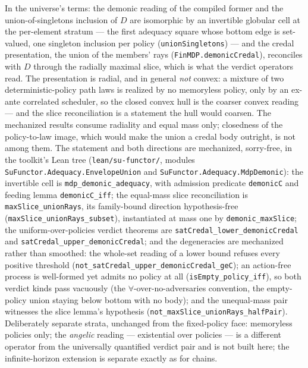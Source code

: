In the universe's terms: the demonic reading of the compiled former
and the union-of-singletons inclusion of $D$ are isomorphic by an
invertible globular cell at the per-element stratum --- the first
adequacy square whose bottom edge is set-valued, one singleton
inclusion per policy (\texttt{unionSingletons}) --- and the credal
presentation, the union of the members' rays
(\texttt{FinMDP.demonicCredal}), reconciles with $D$ through the
radially maximal slice, which is what the verdict operators read.
The presentation is radial, and in general \emph{not} convex: a
mixture of two deterministic-policy path laws is realized by no
memoryless policy, only by an ex-ante correlated scheduler, so the
closed convex hull is the coarser convex reading --- and the slice
reconciliation is a statement the hull would coarsen.  The
mechanized results consume radiality and equal mass only;
closedness of the policy-to-law image, which would make the union a
credal body outright, is not among them.
The statement and both directions are mechanized, sorry-free, in the
toolkit's Lean tree (\texttt{lean/su-functor/}, modules
\texttt{SuFunctor.Adequacy.EnvelopeUnion} and
\texttt{SuFunctor.Adequacy.MdpDemonic}): the invertible cell is
\texttt{mdp\_demonic\_adequacy}, with admission predicate
\texttt{demonicC} and feeding lemma \texttt{demonicC\_iff}; the equal-mass slice reconciliation is
\texttt{maxSlice\_unionRays}, its family-bound direction
hypothesis-free (\texttt{maxSlice\_unionRays\_subset}),
instantiated at mass one by \texttt{demonic\_maxSlice}; the
uniform-over-policies verdict theorems are
\texttt{satCredal\_lower\_demonicCredal} and
\texttt{satCredal\_upper\_demonicCredal}; and the degeneracies are
mechanized rather than smoothed: the whole-set reading of a lower
bound refuses every positive threshold
(\texttt{not\_satCredal\_upper\_demonicCredal\_geC}); an
action-free process is well-formed yet admits no policy at all
(\texttt{isEmpty\_policy\_iff}), so both verdict kinds pass
vacuously (the $\forall$-over-no-adversaries convention, the
empty-policy union staying below bottom with no body); and the
unequal-mass pair witnesses the slice lemma's hypothesis
(\texttt{not\_maxSlice\_unionRays\_halfPair}).  Deliberately separate
strata, unchanged from the fixed-policy face: memoryless policies
only; the \emph{angelic} reading --- existential over policies --- is
a different operator from the universally quantified verdict pair and
is not built here; the infinite-horizon extension is separate exactly
as for chains.

